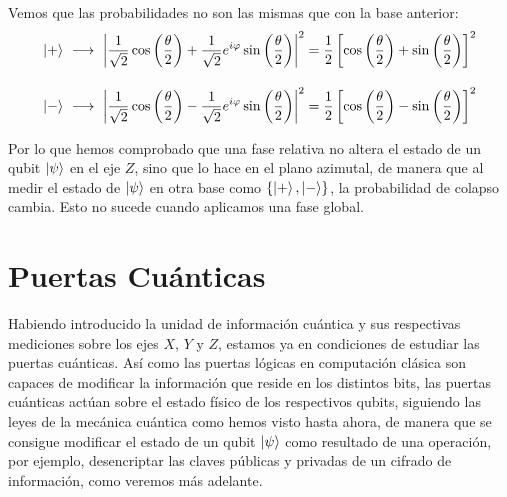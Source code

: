 \documentclass{article}
\numberwithin{equation}{section} %
\begin{document}
    \vspace{2.5mm}

    Vemos que las probabilidades no son las mismas que con la base anterior:
    \begin{align*}
        \ket{+} \ &\longrightarrow \ \left| \frac{1}{\sqrt{2}} \cos \left( \frac{\theta}{2} \right) + \frac{1}{\sqrt{2}} e^{i \varphi} \sin \left( \frac{\theta}{2} \right) \right| ^ {2} = \frac{1}{2} \left[ \cos \left( \frac{\theta}{2} \right) + \sin \left( \frac{\theta}{2} \right)\right] ^ {2} \\[10pt]
        \ket{-} \ &\longrightarrow \ \left| \frac{1}{\sqrt{2}} \cos \left( \frac{\theta}{2} \right) - \frac{1}{\sqrt{2}} e^{i \varphi} \sin \left( \frac{\theta}{2} \right) \right| ^ {2} = \frac{1}{2} \left[ \cos \left( \frac{\theta}{2} \right) - \sin \left( \frac{\theta}{2} \right)\right] ^ {2}
    \end{align*}

    \vspace{5mm}

    Por lo que hemos comprobado que una fase relativa no altera el estado de un qubit \( \ket{\psi} \) en el eje \( Z \), sino que lo hace en el plano azimutal, de manera que al medir el estado de \( \ket{\psi} \) en otra base como \( \{ \ket{+}, \ket{-} \} \), la probabilidad de colapso cambia. Esto no sucede cuando aplicamos una fase global.

    \vspace{10mm}





    \newpage
    \thispagestyle{empty}
    \mbox{}    

    \section{Puertas Cuánticas}\label{sec: puertas_cuanticas}

    \vspace{5mm}

    Habiendo introducido la unidad de información cuántica y sus respectivas mediciones sobre los ejes \( X \), \( Y \) y \( Z \), estamos ya en condiciones de estudiar las puertas cuánticas. Así como las puertas lógicas en computación clásica son capaces de modificar la información que reside en los distintos bits, las puertas cuánticas actúan sobre el estado físico de los respectivos qubits, siguiendo las leyes de la mecánica cuántica como hemos visto hasta ahora, de manera que se consigue modificar el estado de un qubit \( \ket{\psi} \) como resultado de una operación, por ejemplo, desencriptar las claves públicas y privadas de un cifrado de información, como veremos más adelante.
    
\end{document}
